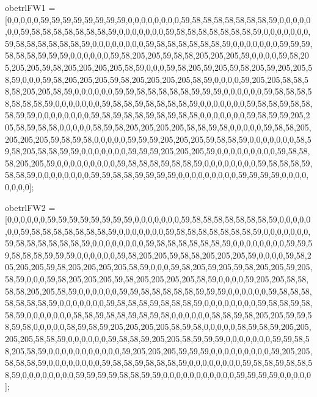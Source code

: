 obetrlFW1 = [0,0,0,0,0,59,59,59,59,59,59,59,59,0,0,0,0,0,0,0,0,59,58,58,58,58,58,58,58,59,0,0,0,0,0,0,0,59,58,58,58,58,58,58,58,59,0,0,0,0,0,0,0,59,58,58,58,58,58,58,58,59,0,0,0,0,0,0,0,59,58,58,58,58,58,58,59,0,0,0,0,0,0,0,0,59,58,58,58,58,58,58,59,0,0,0,0,0,0,0,59,59,59,58,58,58,59,59,59,0,0,0,0,0,0,59,58,205,205,59,58,58,205,205,205,59,0,0,0,0,59,58,205,205,205,59,58,205,205,205,205,58,59,0,0,0,59,58,205,59,205,59,58,205,59,205,205,58,59,0,0,0,59,58,205,205,205,59,58,205,205,205,205,58,59,0,0,0,0,59,205,205,58,58,58,58,205,205,58,59,0,0,0,0,0,0,59,59,58,58,58,58,58,59,59,59,0,0,0,0,0,0,59,58,58,58,58,58,58,58,59,0,0,0,0,0,0,0,59,58,58,59,58,58,58,58,59,0,0,0,0,0,0,0,59,58,58,59,58,58,58,59,59,0,0,0,0,0,0,0,0,59,58,59,58,58,59,58,59,58,58,0,0,0,0,0,0,0,59,58,59,59,205,205,58,59,58,58,0,0,0,0,0,58,59,58,205,205,205,205,58,58,59,58,0,0,0,0,0,59,58,58,205,205,205,205,59,58,59,58,0,0,0,0,0,59,59,59,205,205,205,59,58,58,59,0,0,0,0,0,0,0,58,59,58,205,58,58,59,59,0,0,0,0,0,0,0,59,59,59,205,205,205,59,0,0,0,0,0,0,0,0,0,59,58,58,58,205,205,59,0,0,0,0,0,0,0,0,0,59,58,58,58,59,58,58,59,0,0,0,0,0,0,0,0,59,58,58,58,59,58,58,59,0,0,0,0,0,0,0,0,59,59,58,58,59,59,59,59,0,0,0,0,0,0,0,0,0,59,59,59,59,0,0,0,0,0,0,0,0];

obetrlFW2 = [0,0,0,0,0,0,59,59,59,59,59,59,59,59,0,0,0,0,0,0,0,59,58,58,58,58,58,58,58,59,0,0,0,0,0,0,0,59,58,58,58,58,58,58,58,59,0,0,0,0,0,0,0,59,58,58,58,58,58,58,58,59,0,0,0,0,0,0,0,59,58,58,58,58,58,58,59,0,0,0,0,0,0,0,0,59,58,58,58,58,58,58,59,0,0,0,0,0,0,0,0,59,59,59,58,58,58,59,59,59,0,0,0,0,0,0,59,58,205,205,59,58,58,205,205,205,59,0,0,0,0,59,58,205,205,205,59,58,205,205,205,205,58,59,0,0,0,59,58,205,59,205,59,58,205,205,59,205,58,59,0,0,0,59,58,205,205,205,59,58,205,205,205,205,58,59,0,0,0,0,59,205,205,58,58,58,58,205,205,58,59,0,0,0,0,0,0,59,59,58,58,58,58,58,59,59,59,0,0,0,0,0,0,59,58,58,58,58,58,58,58,59,0,0,0,0,0,0,0,59,58,58,58,59,58,58,58,59,0,0,0,0,0,0,0,0,59,58,58,59,58,58,59,0,0,0,0,0,0,0,58,58,59,58,58,59,58,59,58,0,0,0,0,0,0,58,58,59,58,205,205,59,59,58,59,58,0,0,0,0,0,58,59,58,59,205,205,205,205,58,59,58,0,0,0,0,0,58,59,58,59,205,205,205,205,58,58,59,0,0,0,0,0,0,59,58,58,59,205,205,58,59,59,59,0,0,0,0,0,0,0,59,59,58,58,205,58,59,0,0,0,0,0,0,0,0,0,0,0,59,205,205,205,59,59,59,0,0,0,0,0,0,0,0,0,59,205,205,58,58,58,59,0,0,0,0,0,0,0,0,59,58,58,59,58,58,58,59,0,0,0,0,0,0,0,0,59,58,58,59,58,58,58,59,0,0,0,0,0,0,0,0,59,59,59,59,58,58,59,59,0,0,0,0,0,0,0,0,0,0,0,59,59,59,59,0,0,0,0,0];

